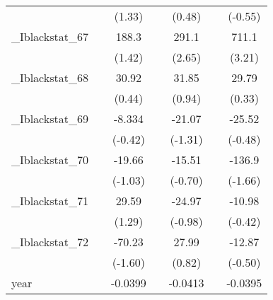 {\begin{tabular}{l*{6}{c}}
            &                     &      (1.33)         &                     &      (0.48)         &                     &     (-0.55)         \\
[1em]
\_Iblackstat\_67&                     &       188.3         &                     &       291.1\sym{*}  &                     &       711.1\sym{**} \\
            &                     &      (1.42)         &                     &      (2.65)         &                     &      (3.21)         \\
[1em]
\_Iblackstat\_68&                     &       30.92         &                     &       31.85         &                     &       29.79         \\
            &                     &      (0.44)         &                     &      (0.94)         &                     &      (0.33)         \\
[1em]
\_Iblackstat\_69&                     &      -8.334         &                     &      -21.07         &                     &      -25.52         \\
            &                     &     (-0.42)         &                     &     (-1.31)         &                     &     (-0.48)         \\
[1em]
\_Iblackstat\_70&                     &      -19.66         &                     &      -15.51         &                     &      -136.9         \\
            &                     &     (-1.03)         &                     &     (-0.70)         &                     &     (-1.66)         \\
[1em]
\_Iblackstat\_71&                     &       29.59         &                     &      -24.97         &                     &      -10.98         \\
            &                     &      (1.29)         &                     &     (-0.98)         &                     &     (-0.42)         \\
[1em]
\_Iblackstat\_72&                     &      -70.23         &                     &       27.99         &                     &      -12.87         \\
            &                     &     (-1.60)         &                     &      (0.82)         &                     &     (-0.50)         \\
[1em]
year        &                     &     -0.0399\sym{***}&                     &     -0.0413\sym{***}&                     &     -0.0395\sym{***}\\

\end{tabular}}
